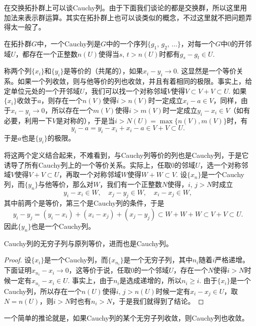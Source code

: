 \begin{para}
在交换拓扑群上可以谈Cauchy列。由于下面我们谈论的都是交换群，所以这里用加法来表示群运算。其实在拓扑群上也可以谈类似的概念，不过这里就不把问题弄得太一般了。

在拓扑群$G$中，一个Cauchy列是$G$中的一个序列$\{g_1$, $g_2$, $\dots\}$，对每一个$G$中$0$的开邻域$U$，都存在一个正整数$n(U)$使得当$s$, $t>n(U)$时都有$g_s-g_t\in U$. 

称两个列$\{x_i\}$和$\{y_i\}$是等价的（共尾的），如果$x_i-y_i\to 0$. 这显然是一个等价关系。如果一个列收敛，则与他等价的列也收敛，并且有着相同的极限。事实上，给定单位元处的一个开邻域$U$，我们可以找一个对称邻域$V$使得$V\subset V+V\subset U$. 如果$\{x_i\}$收敛于$a$，则存在一个$n(V)$使得$i>n(V)$时一定成立$x_i-a\in V$，同样，由于$x_i-y_i\to 0$，所以存在一个$m(V)$使得$i>m(V)$时一定成立$y_i-x_i\in V$（如有必要，利用一下$V$是对称的），于是当$i>N(U)=\max\{n(V),m(V)\}$时，有
\[
	y_i-a=y_i-x_i+x_i-a\in V+V\subset U.
\]
于是$a$也是$\{y_i\}$的极限。

将这两个定义结合起来，不难看到，与Cauchy列等价的列也是Cauchy列，于是它诱导了所有Cauchy列上的一个等价关系。实际上，任取$0$的邻域$U$，选一个对称邻域$V$使得$V+V\subset U$，再取一个对称邻域$W$使得$W+W\subset V$. 设$\{x_n\}$是一个Cauchy列，而$\{y_n\}$与他等价，那么对$W$，我们有一个正整数$N$使得，$i$, $j>N$时成立
\[
	y_i-x_i\in W,\quad x_j-y_j\in W,\quad x_i-x_j\in W,
\]
其中前两个是等价，第三个是Cauchy列的条件，于是
\[
	y_i-y_j=(y_i-x_i)+(x_i-x_j)+(x_j-y_j)\subset W+W+W\subset V+V\subset U.
\]
因此$\{y_n\}$也是一个Cauchy列。

\end{para}

\begin{lem}
	Cauchy列的无穷子列与原列等价，进而也是Cauchy列。
\end{lem}

\begin{proof}
	设$\{x_i\}$是一个Cauchy列，而$\{x_{n_i}\}$是一个无穷子列，其中$n_i$随着$i$严格递增。下面证明$x_{n_i}-x_i\to 0$，这等价于说，任取$0$的一个邻域$U$，存在一个$N$使得$i>N$时候一定有$x_{n_i}-x_{i}\in U$. 事实上，由于$n_i$是选成递增的，所以$n_i\geq i$. 由于$\{x_i\}$是一个Cauchy列，所以存在一个$n(U)$使得$i$, $j>n(U)$时候一定有$x_i-x_j\in U$，取$N=n(U)$，则$i>N$时也有$n_i>N$，于是我们就得到了结论。
\end{proof}

一个简单的推论就是，如果Cauchy列的某个无穷子列收敛，则Cauchy列也收敛。

